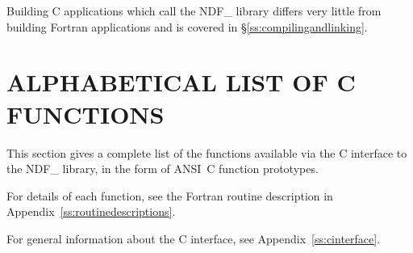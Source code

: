 \documentclass[twoside,11pt,nolof]{starlink}
\begin{document}
Building C applications which call the NDF\_ library differs very
little from building Fortran applications and is covered in
\S\ref{ss:compilingandlinking}.

\newpage
\section{\label{ss:alphalistofcfunctions}ALPHABETICAL LIST OF C FUNCTIONS}

This section gives a complete list of the functions available via the
C interface to the NDF\_ library, in the form of ANSI~C function
prototypes.
\begin{latexonly}For details of each function, see the Fortran routine
description in Appendix~\ref{ss:routinedescriptions}.
\end{latexonly}


For general information about the C interface, see
Appendix~\ref{ss:cinterface}.\\[1.0ex]
\end{document}
